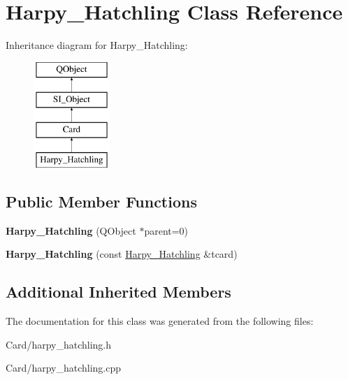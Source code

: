 \hypertarget{class_harpy___hatchling}{}\section{Harpy\+\_\+\+Hatchling Class Reference}
\label{class_harpy___hatchling}
Inheritance diagram for Harpy\+\_\+\+Hatchling\+:\begin{figure}[H]
\begin{center}
\leavevmode
\includegraphics[height=4.000000cm]{class_harpy___hatchling}
\end{center}
\end{figure}
\subsection*{Public Member Functions}
\begin{DoxyCompactItemize}
\item 
\mbox{\label{class_harpy___hatchling_a4bcf5a83fb84ce25933c3f62f7b8def1}} 
{\bfseries Harpy\+\_\+\+Hatchling} (Q\+Object $\ast$parent=0)
\item 
\mbox{\label{class_harpy___hatchling_af1d83810640a15a4c0aec05cd44dc61a}} 
{\bfseries Harpy\+\_\+\+Hatchling} (const \hyperlink{class_harpy___hatchling}{Harpy\+\_\+\+Hatchling} \&tcard)
\end{DoxyCompactItemize}
\subsection*{Additional Inherited Members}


The documentation for this class was generated from the following files\+:\begin{DoxyCompactItemize}
\item 
Card/harpy\+\_\+hatchling.\+h\item 
Card/harpy\+\_\+hatchling.\+cpp\end{DoxyCompactItemize}
